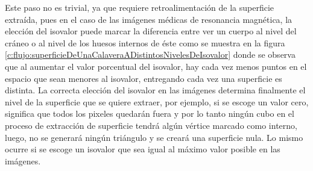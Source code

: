 Este paso no es trivial, ya que requiere retroalimentación de la superficie extraída, pues en el caso de las imágenes médicas de resonancia magnética, la elección del isovalor puede marcar la diferencia entre ver un cuerpo al nivel del cráneo o al nivel de los huesos internos de éste como se muestra en la figura \ref{c:flujo:superficieDeUnaCalaveraADistintosNivelesDeIsovalor} donde se observa que al aumentar el valor porcentual del isovalor, hay cada vez menos puntos en el espacio que sean menores al isovalor, entregando cada vez una superficie es distinta. La correcta elección del isovalor en las imágenes determina finalmente el nivel de la superficie que se quiere extraer, por ejemplo, si se escoge un valor cero, significa que todos los pixeles quedarán fuera y por lo tanto ningún cubo en el proceso de extracción de superficie tendrá algún vértice marcado como interno, luego, no se generará ningún triángulo y se creará una superficie nula.
Lo mismo ocurre si se escoge un isovalor que sea igual al máximo valor posible en las imágenes.

